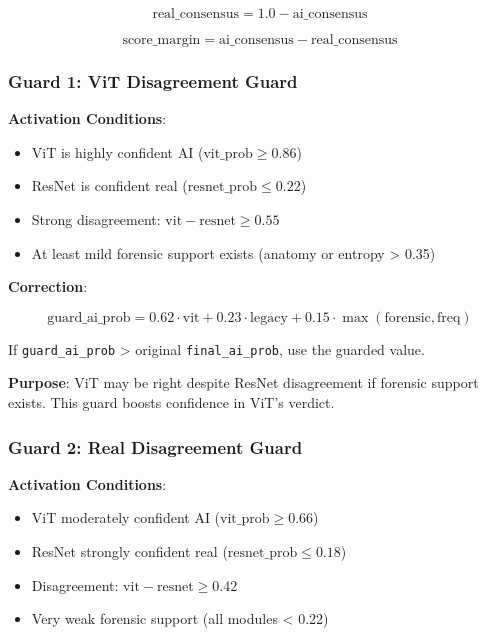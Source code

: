 \documentclass[12pt,a4paper]{book}
\begin{document}
\begin{equation}
\text{real\_consensus} = 1.0 - \text{ai\_consensus}
\end{equation}

\begin{equation}
\text{score\_margin} = \text{ai\_consensus} - \text{real\_consensus}
\end{equation}

\subsubsection{Guard 1: ViT Disagreement Guard}

\textbf{Activation Conditions}:
\begin{itemize}
    \item ViT is highly confident AI ($\text{vit\_prob} \geq 0.86$)
    \item ResNet is confident real ($\text{resnet\_prob} \leq 0.22$)
    \item Strong disagreement: $\text{vit} - \text{resnet} \geq 0.55$
    \item At least mild forensic support exists (anatomy or entropy > 0.35)
\end{itemize}

\textbf{Correction}:

\begin{equation}
\text{guard\_ai\_prob} = 0.62 \cdot \text{vit} + 0.23 \cdot \text{legacy} + 0.15 \cdot \max(\text{forensic}, \text{freq})
\end{equation}

If \texttt{guard\_ai\_prob} > original \texttt{final\_ai\_prob}, use the guarded value.

\textbf{Purpose}: ViT may be right despite ResNet disagreement if forensic support exists. This guard boosts confidence in ViT's verdict.

\subsubsection{Guard 2: Real Disagreement Guard}

\textbf{Activation Conditions}:
\begin{itemize}
    \item ViT moderately confident AI ($\text{vit\_prob} \geq 0.66$)
    \item ResNet strongly confident real ($\text{resnet\_prob} \leq 0.18$)
    \item Disagreement: $\text{vit} - \text{resnet} \geq 0.42$
    \item Very weak forensic support (all modules < 0.22)
\end{itemize}
\end{document}

